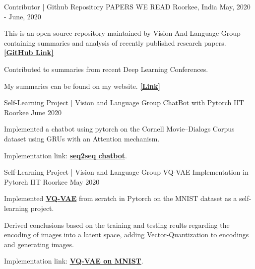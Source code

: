 

\begin{cventries}

  \cventry
    {Contributor | Github Repository} %
    {PAPERS WE READ} %
    {Roorkee, India} %
    {May, 2020 - June, 2020} %
    {
      \begin{cvitems} %
        \item {This is an open source repository maintained by Vision And Language Group containing summaries and analysis of recently published research papers. {\href{https://github.com/vlgiitr/papers_we_read}{\bf [GitHub Link]}}}
        \item {Contributed to summaries from recent Deep Learning Conferences.}
        \item{My summaries can be found on my website. {\href{https://praeclarumjj3.github.io/project/summary_of_papers/}{\bf [Link]}}}
      \end{cvitems}
    }
    
\cventry
    {Self-Learning Project | Vision and Language Group} %
    {ChatBot with Pytorch} %
    {IIT Roorkee} %
    {June 2020} %
    {
      \begin{cvitems} %
        \item {Implemented a chatbot using pytorch on the Cornell Movie--Dialogs Corpus dataset using GRUs with an Attention mechanism.}
        \item {Implementation link: {\href{https://github.com/praeclarumjj3/Chatbot-with-Pytorch}{\bf seq2seq chatbot}}.}
      \end{cvitems}
    }
    
\cventry
    {Self-Learning Project | Vision and Language Group} %
    {VQ-VAE Implementation in Pytorch} %
    {IIT Roorkee} %
    {May 2020} %
    {
      \begin{cvitems} %
        \item {Implemented \href{https://arxiv.org/abs/1711.00937}{\bf VQ-VAE} from scratch in Pytorch on the MNIST dataset as a self-learning project.}
        \item {Derived conclusions based on the training and testing reults regarding the encoding of images into a latent space, adding Vector-Quantization to encodings and generating images.}
        \item {Implementation link: {\href{https://github.com/praeclarumjj3/VQ-VAE-on-MNIST}{\bf VQ-VAE on MNIST}}.}
      \end{cvitems}
    }
      


\end{cventries}
